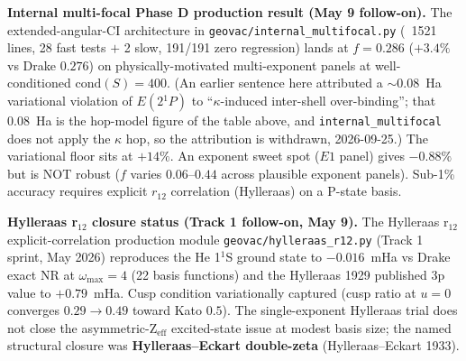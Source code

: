 \documentclass[11pt]{article}
\begin{document}
\textbf{Internal multi-focal Phase D production result (May 9 follow-on).}
The extended-angular-CI architecture in
\texttt{geovac/internal\_multifocal.py} (~1521 lines, 28 fast tests $+$ 2
slow, 191/191 zero regression) lands at $f = 0.286$ ($+3.4\%$ vs Drake
$0.276$) on physically-motivated multi-exponent panels at well-conditioned
$\mathrm{cond}(S) = 400$.  (An earlier sentence here attributed a
$\sim 0.08$~Ha variational violation of $E(2{}^1\!P)$ to
``$\kappa$-induced inter-shell over-binding''; that $0.08$~Ha is the
hop-model figure of the table above, and \texttt{internal\_multifocal}
does not apply the $\kappa$ hop, so the attribution is withdrawn,
2026-09-25.)  The variational floor sits at $+14\%$.  An exponent
sweet spot ($E1$ panel) gives $-0.88\%$ but is NOT robust ($f$ varies
$0.06$--$0.44$ across plausible exponent panels).  Sub-1\% accuracy
requires explicit $r_{12}$ correlation (Hylleraas) on a P-state basis.

\textbf{Hylleraas r$_{12}$ closure status (Track 1 follow-on, May 9).}
The Hylleraas r$_{12}$ explicit-correlation production module
\texttt{geovac/hylleraas\_r12.py} (Track 1 sprint, May 2026) reproduces
the He 1$^1$S ground state to $-0.016$~mHa vs Drake exact NR at
$\omega_{\max} = 4$ (22 basis functions) and the Hylleraas 1929 published
3p value to $+0.79$~mHa.  Cusp condition variationally captured (cusp
ratio at $u=0$ converges $0.29 \to 0.49$ toward Kato $0.5$).  The
single-exponent Hylleraas trial does not close the asymmetric-Z$_{\text{eff}}$
excited-state issue at modest basis size; the named structural closure
was \textbf{Hylleraas--Eckart double-zeta} (Hylleraas--Eckart 1933).
\end{document}
